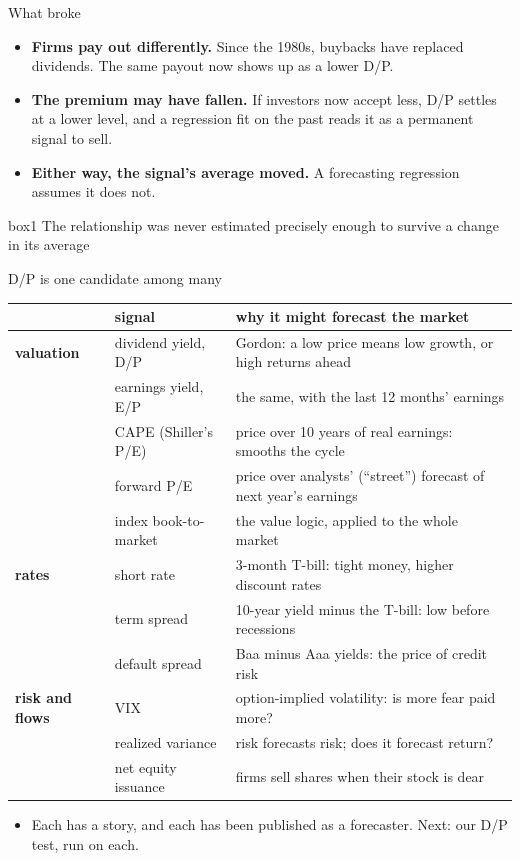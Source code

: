\documentclass[aspectratio=169,10pt]{beamer}
\begin{document}
\begin{frame}{What broke}
\vskip 8pt
\begin{itemize}
\item \textbf{Firms pay out differently.} Since the 1980s, buybacks have replaced dividends. The same payout now shows up as a lower D/P.
\vskip 10pt
\item \textbf{The premium may have fallen.} If investors now accept less, D/P settles at a lower level, and a regression fit on the past reads it as a permanent signal to sell.
\vskip 10pt
\item \textbf{Either way, the signal's average moved.} A forecasting regression assumes it does not.
\end{itemize}
\vskip 14pt
\begin{beamercolorbox}[rounded=true,sep=7pt,center]{box1}
The relationship was never estimated precisely enough to survive a change in its average
\end{beamercolorbox}
\end{frame}

\begin{frame}{D/P is one candidate among many}
\begin{center}
\footnotesize
\renewcommand{\arraystretch}{1.1}
\begin{tabular}{@{}p{2.0cm}p{3.2cm}p{7.9cm}@{}}
\toprule
 & signal & why it might forecast the market \\
\midrule
\textbf{valuation} & dividend yield, D/P & Gordon: a low price means low growth, or high returns ahead \\
 & earnings yield, E/P & the same, with the last 12 months' earnings \\
 & CAPE (Shiller's P/E) & price over 10 years of real earnings: smooths the cycle \\
 & forward P/E & price over analysts' (``street'') forecast of next year's earnings \\
 & index book-to-market & the value logic, applied to the whole market \\
\midrule
\textbf{rates} & short rate & 3-month T-bill: tight money, higher discount rates \\
 & term spread & 10-year yield minus the T-bill: low before recessions \\
 & default spread & Baa minus Aaa yields: the price of credit risk \\
\midrule
\textbf{risk and flows} & VIX & option-implied volatility: is more fear paid more? \\
 & realized variance & risk forecasts risk; does it forecast return? \\
 & net equity issuance & firms sell shares when their stock is dear \\
\bottomrule
\end{tabular}
\end{center}
\vskip -2pt
\begin{itemize}
\item Each has a story, and each has been published as a forecaster. Next: our D/P test, run on each.
\end{itemize}
\end{frame}
\end{document}
